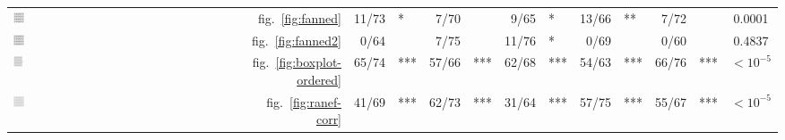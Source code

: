 \documentclass[12pt]{article} %
\begin{document}
\begin{table}[ht]
\begin{tabular}{Mrrlrlrlrlrlc}
\includegraphics[width=0.05\textwidth]{examfanned-icon}&  fig.~\ref{fig:fanned} & 11/73&\hspace{-0.1in}* & 7/70&\hspace{-0.1in} & 9/65&\hspace{-0.1in}*& 13/66&\hspace{-0.1in}** & 7/72&\hspace{-0.1in} & 0.0001\\ 
 \includegraphics[width=0.05\textwidth]{exam-with-slope-icon} & fig.~\ref{fig:fanned2} & 0/64 & \hspace{-0.1in}  & 7/75 & \hspace{-0.1in}  & 11/76 & \hspace{-0.1in}* & 0/69 & \hspace{-0.1in}  & 0/60 & \hspace{-0.1in} & 0.4837 \\ 
%
\includegraphics[width=0.05\textwidth]{autism-ordered-icon}&   fig.~\ref{fig:boxplot-ordered} & 65/74&\hspace{-0.1in}*** & 57/66&\hspace{-0.1in}*** & 62/68&\hspace{-0.1in}*** & 54/63&\hspace{-0.1in}*** & 66/76&\hspace{-0.1in}*** & $<10^{-5}$\\ 
 \includegraphics[width=0.05\textwidth]{examcorr-icon}&   fig.~\ref{fig:ranef-corr} & 41/69&\hspace{-0.1in}*** & 62/73&\hspace{-0.1in}*** & 31/64&\hspace{-0.1in}*** & 57/75&\hspace{-0.1in}*** & 55/67&\hspace{-0.1in}*** & $<10^{-5}$\\ 

\end{tabular}
\end{table}
\end{document}
